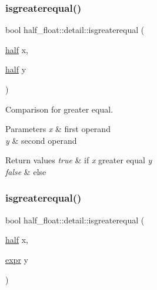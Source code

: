 \subsubsection{\texorpdfstring{isgreaterequal()}{isgreaterequal()}\hspace{0.1cm}{\footnotesize\ttfamily [1/4]}}
{\footnotesize\ttfamily bool half\+\_\+float\+::detail\+::isgreaterequal (\begin{DoxyParamCaption}\item[{\hyperlink{classhalf__float_1_1half}{half}}]{x,  }\item[{\hyperlink{classhalf__float_1_1half}{half}}]{y }\end{DoxyParamCaption})\hspace{0.3cm}{\ttfamily [inline]}}

Comparison for greater equal. 
\begin{DoxyParams}{Parameters}
{\em x} & first operand \\
\hline
{\em y} & second operand \\
\hline
\end{DoxyParams}

\begin{DoxyRetVals}{Return values}
{\em true} & if {\itshape x} greater equal {\itshape y} \\
\hline
{\em false} & else \\
\hline
\end{DoxyRetVals}
\mbox{\label{namespacehalf__float_1_1detail_a2b2f028b697b695c82cde2bf921af6d5}} 
\subsubsection{\texorpdfstring{isgreaterequal()}{isgreaterequal()}\hspace{0.1cm}{\footnotesize\ttfamily [2/4]}}
{\footnotesize\ttfamily bool half\+\_\+float\+::detail\+::isgreaterequal (\begin{DoxyParamCaption}\item[{\hyperlink{classhalf__float_1_1half}{half}}]{x,  }\item[{\hyperlink{structhalf__float_1_1detail_1_1expr}{expr}}]{y }\end{DoxyParamCaption})\hspace{0.3cm}{\ttfamily [inline]}}


